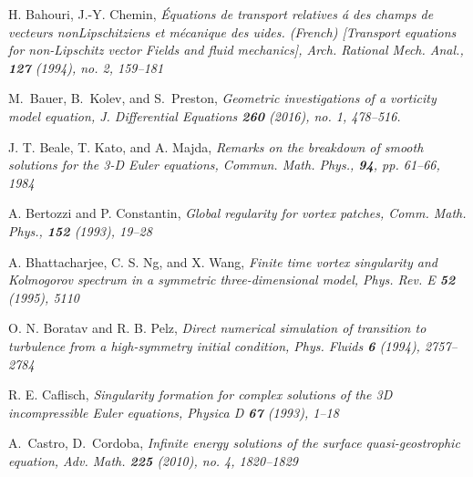 \documentclass[reqno,centertags, 11pt]{amsart}
\begin{document}
\begin{thebibliography}{99}

 H. Bahouri, J.-Y. Chemin, \it \'Equations de transport relatives \'a des champs de vecteurs nonLipschitziens et m\'ecanique des
uides. (French) [Transport equations for non-Lipschitz vector
Fields and fluid mechanics], \rm  Arch. Rational Mech. Anal., {\bf 127} (1994), no. 2, 159--181

 M.~Bauer, B.~Kolev, and S.~Preston, \it Geometric investigations of a vorticity model equation, \rm J.
Differential Equations {\bf 260} (2016), no. 1, 478--516.

J. T. Beale, T. Kato, and A. Majda,  \it Remarks on the breakdown of smooth solutions for the 3-D Euler equations, \rm
Commun. Math. Phys., {\bf 94}, pp. 61--66, 1984

 A. Bertozzi and P. Constantin, \it Global regularity for vortex patches, \rm Comm. Math. Phys., {\bf 152} (1993), 19--28

 A. Bhattacharjee, C. S. Ng, and X. Wang, \it Finite time vortex singularity and Kolmogorov spectrum in a symmetric three-dimensional model,
\rm Phys. Rev. E {\bf 52} (1995), 5110

 O. N. Boratav and R. B. Pelz, \it Direct numerical simulation of transition to turbulence from a
high-symmetry initial condition, \rm Phys. Fluids {\bf 6} (1994), 2757--2784


 R. E. Caflisch, \it Singularity formation for complex solutions of the 3D incompressible Euler equations,
\rm Physica D {\bf 67} (1993), 1--18

 A.~Castro, D.~Cordoba, \it Infinite energy solutions of the surface quasi-geostrophic equation, \rm
Adv. Math. {\bf 225} (2010), no. 4, 1820--1829




\end{thebibliography}
\end{document}
